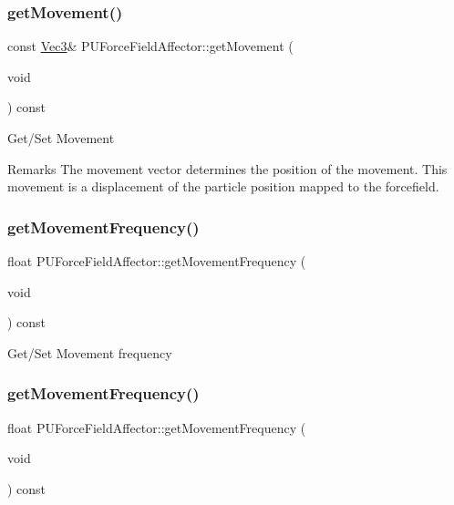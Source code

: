 \subsubsection{\texorpdfstring{get\+Movement()}{getMovement()}\hspace{0.1cm}{\footnotesize\ttfamily [2/2]}}
{\footnotesize\ttfamily const \hyperlink{classVec3}{Vec3}\& P\+U\+Force\+Field\+Affector\+::get\+Movement (\begin{DoxyParamCaption}\item[{void}]{ }\end{DoxyParamCaption}) const}

Get/\+Set Movement \begin{DoxyRemark}{Remarks}
The movement vector determines the position of the movement. This movement is a displacement of the particle position mapped to the forcefield. 
\end{DoxyRemark}
\mbox{\label{classPUForceFieldAffector_a208862ee82ecc2a325246ec84047ce80}} 
\subsubsection{\texorpdfstring{get\+Movement\+Frequency()}{getMovementFrequency()}\hspace{0.1cm}{\footnotesize\ttfamily [1/2]}}
{\footnotesize\ttfamily float P\+U\+Force\+Field\+Affector\+::get\+Movement\+Frequency (\begin{DoxyParamCaption}\item[{void}]{ }\end{DoxyParamCaption}) const}

Get/\+Set Movement frequency \mbox{\label{classPUForceFieldAffector_a208862ee82ecc2a325246ec84047ce80}} 
\subsubsection{\texorpdfstring{get\+Movement\+Frequency()}{getMovementFrequency()}\hspace{0.1cm}{\footnotesize\ttfamily [2/2]}}
{\footnotesize\ttfamily float P\+U\+Force\+Field\+Affector\+::get\+Movement\+Frequency (\begin{DoxyParamCaption}\item[{void}]{ }\end{DoxyParamCaption}) const}

